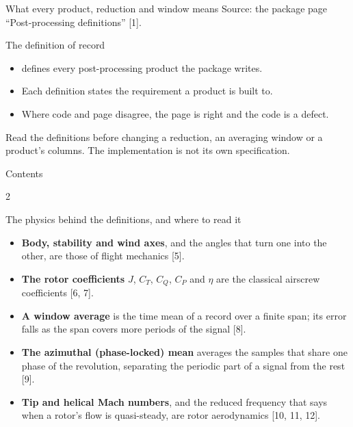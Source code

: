 \documentclass[aspectratio=169,11pt]{beamer}
\begin{document}
  {What every product, reduction and window means}
  {Source: the package page ``Post-processing definitions'' [1].}

\begin{frame}{The definition of record}
\begin{itemize}
  \item {} defines every
        post-processing product the package writes.
  \item Each definition states the requirement a product is built to.
  \item Where code and page disagree, the page is right and the code is a defect.
\end{itemize}
\begin{takeaway}
Read the definitions before changing a reduction, an averaging window or a
product's columns. The implementation is not its own specification.
\end{takeaway}
\end{frame}

\begin{frame}{Contents}
\small
\begin{multicols}{2}
\tableofcontents
\end{multicols}
\end{frame}

















\begin{frame}{The physics behind the definitions, and where to read it}
\begin{itemize}\small
  \item \textbf{Body, stability and wind axes}, and the angles that turn one
        into the other, are those of flight mechanics [5].
  \item \textbf{The rotor coefficients} \(J\), \(C_T\), \(C_Q\), \(C_P\) and
        \(\eta\) are the classical airscrew coefficients [6, 7].
  \item \textbf{A window average} is the time mean of a record over a finite
        span; its error falls as the span covers more periods of the signal
        [8].
  \item \textbf{The azimuthal (phase-locked) mean} averages the samples that
        share one phase of the revolution, separating the periodic part of a
        signal from the rest [9].
  \item \textbf{Tip and helical Mach numbers}, and the reduced frequency
        that says when a rotor's flow is quasi-steady, are rotor aerodynamics
        [10, 11, 12].
\end{itemize}
\end{frame}
\end{document}
